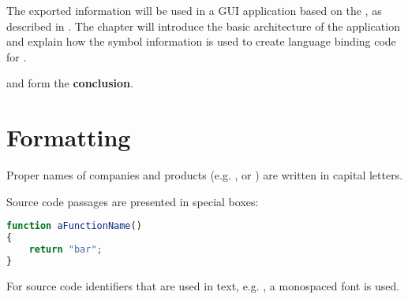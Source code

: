 The exported information will be used in a GUI application based on the , as described in . The chapter will introduce the basic architecture of the application and explain how the symbol information is used to create language binding code for .

 and  form the \textbf{conclusion}.

\section{Formatting}

Proper names of companies and products (e.g. ,   or ) are written in capital letters.

Source code passages are presented in special boxes:

\SingleSpacing
\begin{lstlisting}[language=JavaScript, caption=Example source code]
function aFunctionName()
{
	return "bar";
}
\end{lstlisting}
\OnehalfSpacing

For source code identifiers that are used in text, e.g. , a monospaced font is used.






